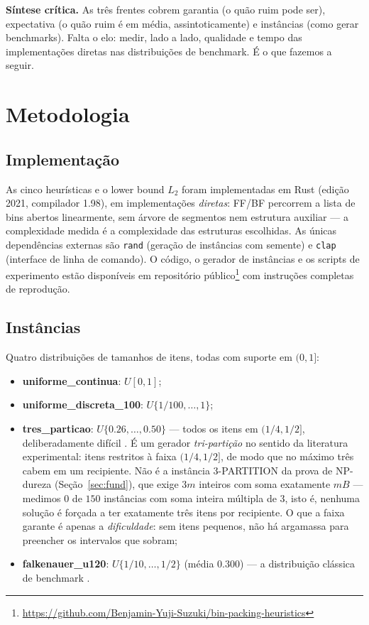 \documentclass[12pt]{article}
\begin{document}
\textbf{Síntese crítica.} As três frentes cobrem garantia (o quão ruim pode ser), expectativa (o quão ruim é em média, assintoticamente) e instâncias (como gerar benchmarks). Falta o elo: medir, lado a lado, qualidade e tempo das implementações diretas nas distribuições de benchmark. É o que fazemos a seguir.

\section{Metodologia} \label{sec:met}

\subsection{Implementação}

As cinco heurísticas e o lower bound $L_2$ foram implementadas em Rust (edição 2021, compilador 1.98), em implementações \textit{diretas}: FF/BF percorrem a lista de bins abertos linearmente, sem árvore de segmentos nem estrutura auxiliar --- a complexidade medida é a complexidade das estruturas escolhidas. As únicas dependências externas são \texttt{rand} (geração de instâncias com semente) e \texttt{clap} (interface de linha de comando). O código, o gerador de instâncias e os scripts de experimento estão disponíveis em repositório público\footnote{\url{https://github.com/Benjamin-Yuji-Suzuki/bin-packing-heuristics}} com instruções completas de reprodução.

\subsection{Instâncias}

Quatro distribuições de tamanhos de itens, todas com suporte em $(0,1]$:
\begin{itemize}[nosep]
  \item \textbf{uniforme\_continua}: $U[0,1]$;
  \item \textbf{uniforme\_discreta\_100}: $U\{1/100, \ldots, 1\}$;
  \item \textbf{tres\_particao}: $U\{0.26, \ldots, 0.50\}$ --- todos os itens em $(1/4, 1/2]$, deliberadamente difícil \cite{ayyadevara2025}. É um gerador \emph{tri-partição} no sentido da literatura experimental: itens restritos à faixa $(1/4, 1/2]$, de modo que no máximo três cabem em um recipiente. Não é a instância \textsc{3-PARTITION} da prova de NP-dureza (Seção~\ref{sec:fund}), que exige $3m$ inteiros com soma exatamente $mB$ --- medimos $0$ de $150$ instâncias com soma inteira múltipla de $3$, isto é, nenhuma solução é forçada a ter exatamente três itens por recipiente. O que a faixa garante é apenas a \emph{dificuldade}: sem itens pequenos, não há argamassa para preencher os intervalos que sobram;
  \item \textbf{falkenauer\_u120}: $U\{1/10, \ldots, 1/2\}$ (média 0.300) --- a distribuição clássica de benchmark \cite{falkenauer1996}.
\end{itemize}
\end{document}
